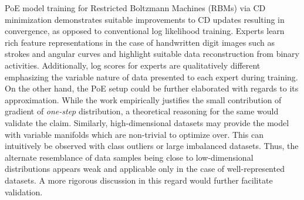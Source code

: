 \documentclass[11pt,letterpaper]{article}
\begin{document}
PoE model training for Restricted Boltzmann Machines (RBMs) via CD minimization demonstrates suitable improvements to CD updates resulting in convergence, as opposed to conventional log likelihood training. Experts learn rich feature representations in the case of handwritten digit images such as strokes and angular curves and highlight suitable data reconstruction from binary activities. Additionally, log scores for experts are qualitatively different emphasizing the variable nature of data presented to each expert during training. On the other hand, the PoE setup could be further elaborated with regards to its approximation. While the work empirically justifies the small contribution of gradient of \textit{one-step} distribution, a theoretical reasoning for the same would validate the claim. Similarly, high-dimensional datasets may provide the model with variable manifolds which are non-trivial to optimize over. This can intuitively be observed with class outliers or large imbalanced datasets. Thus, the alternate resemblance of data samples being close to low-dimensional distributions appears weak and applicable only in the case of well-represented datasets. A more rigorous discussion in this regard would further facilitate validation. 
\end{document}
